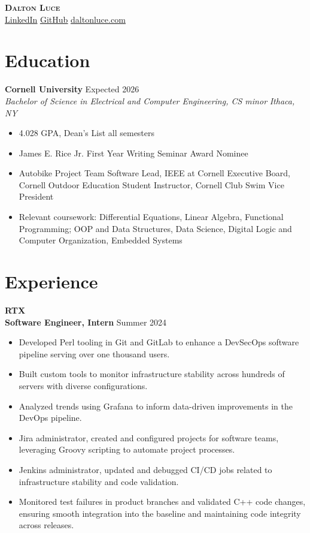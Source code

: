 \documentclass[letterpaper,8pt]{article}
\newcommand{\company}[1]{
    \vspace{4pt}
    \large \textbf{#1}
    \\
}
\newcommand{\position}[2]{
    \vspace{2pt}
    \normalsize \textbf {#1}
    \hfill {\small #2}
    \\
    \normalsize
}
\newcommand{\resumeEntry}[4]{
    \vspace{4pt}
    \large \textbf{#1}
    \normalsize \hfill #2
    \\
    \textit{#3} \hfill \textit{#4}
    \vspace{1pt}
}
\newcommand{\itemsBegin}{
    \begin{itemize}[leftmargin=0.2in, labelsep=0.05in, itemsep=0pt, parsep=1pt, topsep=0pt, partopsep=0pt]
}
\newcommand{\itemsEnd}{\end{itemize}}
\begin{document}
\textbf{\huge \scshape Dalton Luce} \\
\vspace{2pt}
\small
\addressConditional
\phoneConditional
\emailConditional
\href{https://www.linkedin.com/in/dalton-luce/}{\underline{LinkedIn}}
\hspace{10pt}
\href{https://github.com/da-luce}{\underline{GitHub}}
\hspace{10pt}
\href{https://daltonluce.com/}{\underline{daltonluce.com}}
\vspace{-5pt}

\section{Education}

    \resumeEntry
        {Cornell University}
        {Expected 2026}
        {Bachelor of Science in Electrical and Computer Engineering, CS minor}
        {Ithaca, NY}

    \itemsBegin
        \item 4.028 GPA, Dean's List all semesters
        \item James E. Rice Jr. First Year Writing Seminar Award Nominee
        \item Autobike Project Team Software Lead, IEEE at Cornell Executive Board, Cornell Outdoor Education Student Instructor, Cornell Club Swim Vice President
        \item Relevant coursework: Differential Equations, Linear Algebra, Functional Programming; OOP and Data Structures, Data Science, Digital Logic and Computer Organization, Embedded Systems
    \itemsEnd

\section{Experience}

    \company{RTX}

    \position{Software Engineer, Intern}{Summer 2024}
    \itemsBegin
        \item Developed Perl tooling in Git and GitLab to enhance a DevSecOps software pipeline serving over one thousand users.
        \item Built custom tools to monitor infrastructure stability across hundreds of servers with diverse configurations.
        \item Analyzed trends using Grafana to inform data-driven improvements in the DevOps pipeline.
        \item Jira administrator, created and configured projects for software teams, leveraging Groovy scripting to automate project processes. \item Jenkins administrator, updated and debugged CI/CD jobs related to infrastructure stability and code validation.
        \item Monitored test failures in product branches and validated C++ code changes, ensuring smooth integration into the baseline and maintaining code integrity across releases.
    \itemsEnd
\end{document}
